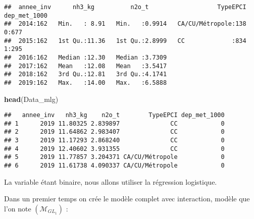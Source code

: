 \documentclass[
]{article}
\newenvironment{Shaded}{\begin{snugshade}}{\end{snugshade}}
\newcommand{\FunctionTok}[1]{\textcolor[rgb]{0.13,0.29,0.53}{\textbf{#1}}}
\newcommand{\NormalTok}[1]{#1}
\begin{document}
\begin{verbatim}
##  annee_inv      nh3_kg          n2o_t                   TypeEPCI   dep_met_1000
##  2014:162   Min.   : 8.91   Min.   :0.9914   CA/CU/Métropole:138   0:677       
##  2015:162   1st Qu.:11.36   1st Qu.:2.8999   CC             :834   1:295       
##  2016:162   Median :12.30   Median :3.7309                                     
##  2017:162   Mean   :12.08   Mean   :3.5417                                     
##  2018:162   3rd Qu.:12.81   3rd Qu.:4.1741                                     
##  2019:162   Max.   :14.00   Max.   :6.5888
\end{verbatim}

\begin{Shaded}
\begin{Highlighting}[]
\FunctionTok{head}\NormalTok{(Data\_mlg)}
\end{Highlighting}
\end{Shaded}

\begin{verbatim}
##   annee_inv   nh3_kg    n2o_t        TypeEPCI dep_met_1000
## 1      2019 11.80325 2.839897              CC            0
## 2      2019 11.64862 2.983407              CC            0
## 3      2019 11.17293 2.868240              CC            0
## 4      2019 12.40602 3.931355              CC            0
## 5      2019 11.77857 3.204371 CA/CU/Métropole            0
## 6      2019 11.61738 4.090337 CA/CU/Métropole            0
\end{verbatim}

La variable  étant binaire, nous allons utiliser la
régression logistique.

Dans un premier temps on crée le modèle complet avec interaction, modèle
que l'on note \((\mathcal{M}_{GL_{1}})\) :
\end{document}
